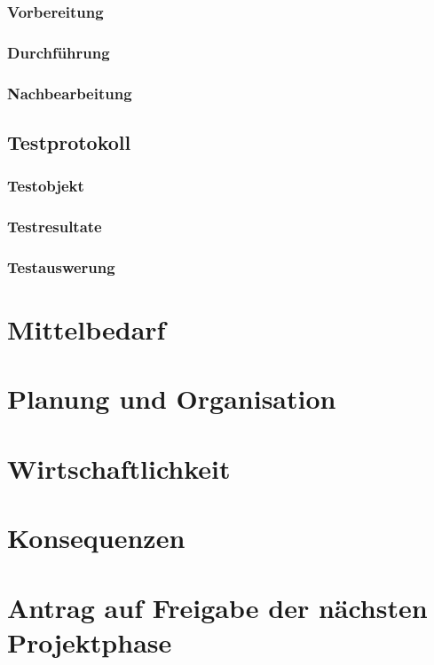 \documentclass[10pt,paper=a4,final]{scrartcl}
\begin{document}
\subsubsection{Vorbereitung}
\subsubsection{Durchf\"uhrung}
\subsubsection{Nachbearbeitung}
\subsection{Testprotokoll}
\subsubsection{Testobjekt}
\subsubsection{Testresultate}
\subsubsection{Testauswerung}
\section{Mittelbedarf}
\section{Planung und Organisation}
\section{Wirtschaftlichkeit}
\section{Konsequenzen}
\section{Antrag auf Freigabe der n\"achsten Projektphase}
\end{document}
